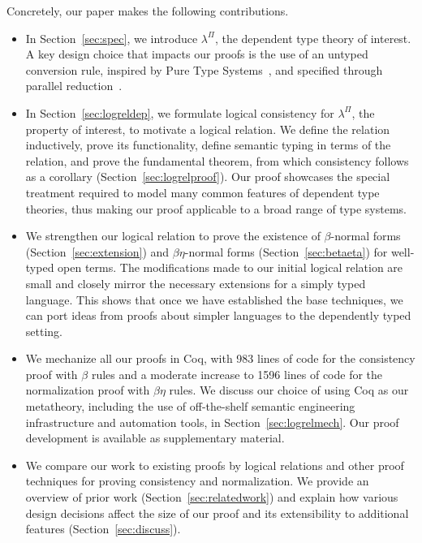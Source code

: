 \documentclass[\ifpublic nolinenum\else\fi,online,OA]{jfp}
\newcommand{\lang}{$\lambda^{\Pi}$\xspace}
\theoremstyle{definition}
\begin{document}
Concretely, our paper makes the following contributions.
\begin{itemize}
\item In Section~\ref{sec:spec}, we introduce \lang{}, the dependent type
  theory of interest. A key design choice that impacts our proofs is the use
  of an untyped conversion rule, inspired by Pure Type
  Systems~\citep{barendregt1991introduction}, and specified through parallel
  reduction~\citep{takahashi-parallel-reduction,
    barendregt:lambda-calculi-with-types}.
\item In Section~\ref{sec:logreldep}, we formulate logical consistency for
  \lang{}, the property of interest, to motivate a logical relation. We
  define the relation inductively, prove its functionality,
  define semantic typing in terms of the relation, and prove the
  fundamental theorem, from which consistency follows as a corollary
  (Section~\ref{sec:logrelproof}). Our proof
  showcases the special treatment required to model many common
  features of dependent type theories, thus making our proof applicable to a
  broad range of type systems.
\item We strengthen our logical relation to prove the existence of
  $\beta$-normal forms (Section~\ref{sec:extension}) and $\beta\eta$-normal
  forms (Section~\ref{sec:betaeta}) for well-typed open terms. The
  modifications made to our initial logical relation are small and closely
  mirror the necessary extensions for a simply typed language. This shows
  that once we have established the base techniques, we can port
  ideas from proofs about simpler languages to the dependently typed setting.
\item We mechanize all our proofs in Coq, with 983
  lines of code for the consistency proof with $\beta$ rules and a moderate
  increase to 1596 lines of code for the normalization proof with $\beta\eta$
  rules. We discuss our choice of using Coq as our metatheory,
  including the use of off-the-shelf
  semantic engineering infrastructure and automation tools, in
  Section~\ref{sec:logrelmech}. Our proof development is available as
  supplementary material.
\item We compare our work to existing proofs by logical relations and other
  proof techniques for proving consistency and normalization.  We provide an
  overview of prior work (Section~\ref{sec:relatedwork}) and explain
  how various design decisions affect the size of our
  proof and its extensibility to additional features
  (Section~\ref{sec:discuss}).
\end{itemize}
\end{document}
